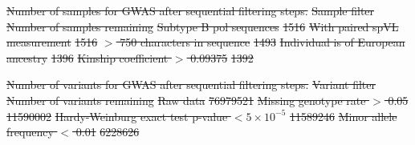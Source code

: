 \documentclass[11pt]{article} %
\providecommand{\DIFdel}[1]{{\protect\color{red}\sout{#1}}}                      %
\providecommand{\DIFdelFL}[1]{\DIFdel{#1}} %
\begin{document}
{%
\DIFdelFL{Number of samples for GWAS after sequential filtering steps.}}
\DIFdelFL{Sample filter }%
\DIFdelFL{Number of samples remaining }%
\DIFdelFL{Subtype B pol sequences }%
\DIFdelFL{1516 }%
\DIFdelFL{With paired spVL measurement }%
\DIFdelFL{1516 }%
\DIFdelFL{$>$ 750 characters in sequence }%
\DIFdelFL{1493 }%
\DIFdelFL{Individual is of European ancestry }%
\DIFdelFL{1396 }%
\DIFdelFL{Kinship coefficient $>$ 0.09375 }%
\DIFdelFL{1392 }%

{%
\DIFdelFL{Number of variants for GWAS after sequential filtering steps.}}
\DIFdelFL{Variant filter }%
\DIFdelFL{Number of variants remaining }%
\DIFdelFL{Raw data }%
\DIFdelFL{76979521 }%
\DIFdelFL{Missing genotype rate $>$ 0.05 }%
\DIFdelFL{11590002 }%
\DIFdelFL{Hardy-Weinburg exact test p-value $< 5 \times 10^{-5}$ }%
\DIFdelFL{11589246 }%
\DIFdelFL{Minor allele frequency $<$ 0.01 }%
\DIFdelFL{6228626 }%
\end{document}
